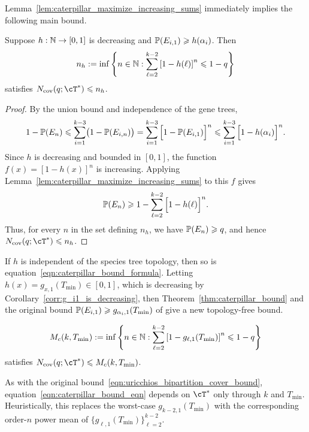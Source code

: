 \noindent Lemma~\ref{lem:caterpillar_maximize_increasing_sums} immediately implies the following main bound.

\begin{theorem}
\label{thm:caterpillar_bound}
    Suppose $h: \N \to [0,1]$ is decreasing and $\P(E_{i,1}) \geq h(\alpha_i)$. Then
%
\begin{equation}
    n_h := \inf\left\{n \in \N : \sum_{\ell=2}^{k-2}\left[1-h(\ell)\right]^n \leq 1-q\right\}
    \label{eqn:caterpillar_bound_formula}
\end{equation}
%
\noindent satisfies $N_{\mathrm{cov}}(q;\cT^*)\leq n_h$.
\end{theorem}

\begin{proof}
By the union bound and independence of the gene trees,
\[
1-\P(E_n)
\leq \sum_{i=1}^{k-3} \bigl(1-\P(E_{i,n})\bigr)
= \sum_{i=1}^{k-3} \Big[1-\P(E_{i,1})\Big]^n
\leq \sum_{i=1}^{k-3} \Big[1-h(\alpha_i)\Big]^n.
\]
Since $h$ is decreasing and bounded in $[0,1]$, the function
$f(x)=[1-h(x)]^n$ is increasing. Applying
Lemma~\ref{lem:caterpillar_maximize_increasing_sums} to this $f$ gives
\[
\P(E_n) \geq 1-\sum_{\ell=2}^{k-2}\Big[1-h(\ell)\Big]^n.
\]
Thus, for every $n$ in the set defining $n_h$, we have
$\P(E_n)\geq q$, and hence $N_{\mathrm{cov}}(q;\cT^*)\leq n_h$.
\end{proof}

\noindent If $h$ is independent of the species tree topology,
then so is equation~\eqref{eqn:caterpillar_bound_formula}. Letting
$h(x) = g_{x,1}(T_{\mathrm{min}}) \in [0,1]$, which is decreasing by
Corollary~\ref{corr:g_i1_is_decreasing}, then Theorem~\ref{thm:caterpillar_bound} and the
original bound $\P(E_{i,1}) \geq g_{\alpha_i,1}(T_{\mathrm{min}})$
of \citet{uricchio2016_bipartition_cover} give a new topology-free bound.

\begin{corollary}
\label{cor:improved_bipartition_cover_bound_caterpillar}
\begin{equation}
    M_c(k, T_{\mathrm{min}}):=  \inf\left\{n \in \N : \sum_{\ell=2}^{k-2}\left[1-g_{\ell,1 }(T_{\mathrm{min}})\right]^n \leq 1-q\right\}
    \label{eqn:caterpillar_bound_eqn}
\end{equation}
%
\noindent satisfies $N_{\mathrm{cov}}(q;\cT^*)\leq M_c(k,T_{\mathrm{min}})$.
\end{corollary}

\noindent As with the original bound~\eqref{eqn:uricchios_bipartition_cover_bound}, equation~\eqref{eqn:caterpillar_bound_eqn}
depends on $\cT^*$ only through $k$ and $T_{\mathrm{min}}$. Heuristically, this
replaces the worst-case $g_{k-2, 1}(T_{\mathrm{min}})$ with the corresponding
order-$n$ power mean of $\{g_{\ell, 1}(T_{\mathrm{min}})\}_{\ell = 2}^{k-2}.$

